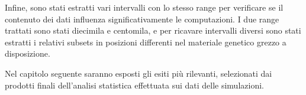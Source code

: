 Infine, sono stati estratti vari intervalli con lo stesso range per verificare se il contenuto dei dati influenza significativamente le computazioni.
I due range trattati sono stati diecimila e centomila, e per ricavare intervalli diversi sono stati estratti i relativi subsets in posizioni differenti nel materiale genetico grezzo a disposizione.

Nel capitolo seguente saranno esposti gli esiti più rilevanti, selezionati dai prodotti finali dell'analisi statistica effettuata sui dati delle simulazioni.  

